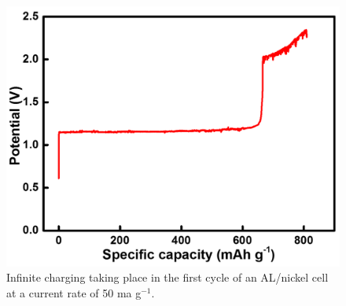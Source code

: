 \begin{figure}[tbh!]
\centering
\includegraphics[width=\textwidth]{Figures/chap7fig/nickel}
\caption{Infinite charging taking place in the first cycle of an AL/nickel cell at a current rate of 50 ma g$^{-1}$.}
\label{Figures/chap7fig:nickel}
\end{figure}

